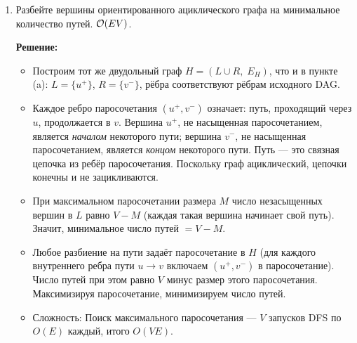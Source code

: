 \begin{enumerate}
\begin{enumerate}
\begin{itemize}
          \item Сложность: Ищем максимальное паросочетание в $H$ методом
          увеличивающих путей: запускаем DFS из каждой из $V$ вершин левой доли,
          каждый DFS обходит не более $O(E)$ рёбер графа $H$ (рёбра $H$ биективны рёбрам
          исходного графа). Итого $O(VE)$.
          В конце проверяем, что паросочетание совершенно.

          \item Восстановление циклов: По паросочетанию для каждого $u$ известен
          единственный ``следующий`` сосед. Обходя цепочки соседей, выписываем циклы за $O(V)$.
        \end{itemize}

      \item
        Разбейте вершины ориентированного ациклического графа на минимальное количество путей. $\mathcal{O}(E V)$.

        \textbf{Решение:}

        \begin{itemize}
          \item Построим тот же двудольный граф $H = (L \cup R,\; E_H)$, что и в пункте (a):
          $L = \{u^+\}$, $R = \{v^-\}$, рёбра соответствуют рёбрам исходного DAG.

          \item Каждое ребро паросочетания $(u^+, v^-)$
          означает: путь, проходящий через $u$, продолжается в $v$.
          Вершина $u^+$, не насыщенная паросочетанием, является \emph{началом} некоторого пути;
          вершина $v^-$, не насыщенная паросочетанием, является \emph{концом} некоторого пути.
          Путь --- это связная цепочка из ребёр паросочетания.
          Поскольку граф ациклический, цепочки конечны и не зацикливаются.

          \item При максимальном паросочетании размера $M$ число незасыщенных
          вершин в $L$ равно $V - M$ (каждая такая вершина начинает свой путь).
          Значит, минимальное число путей $= V - M$.

          \item Любое разбиение на пути задаёт паросочетание в $H$
          (для каждого внутреннего ребра пути $u \to v$ включаем $(u^+, v^-)$ в паросочетание).
          Число путей при этом равно $V$ минус размер этого паросочетания.
          Максимизируя паросочетание, минимизируем число путей.

          \item Сложность: Поиск максимального паросочетания --- $V$ запусков DFS по
          $O(E)$ каждый, итого $O(VE)$.


\end{itemize}
\end{enumerate}
\end{enumerate}
